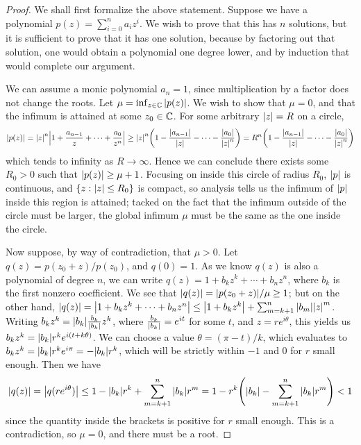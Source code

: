 \begin{proof}
    We shall first formalize the above statement.
    Suppose we have a polynomial \(p(z) = \sum_{i=0}^n a_i z^i\).
    We wish to prove that this has \(n\) solutions,
    but it is sufficient to prove that it has one solution,
    because by factoring out that solution,
    one would obtain a polynomial one degree lower,
    and by induction that would complete our argument.

    We can assume a monic polynomial \(a_n = 1\),
    since multiplication by a factor does not change the roots.
    Let \(\mu = \inf_{z\in\mathbb{C}}\abs{p(z)}\).
    We wish to show that \(\mu = 0\),
    and that the infimum is attained at some \(z_0 \in \mathbb{C}\).
    For some arbitrary \(\abs{z} = R\) on a circle,
    \begin{equation*}
        \abs{p(z)}
        = \abs{z}^n\abs{1 + \frac{a_{n-1}}{z} + \cdots + \frac{a_0}{z^n}}
        \geq \abs{z}^n\qty(1 - \frac{\abs{a_{n-1}}}{\abs{z}}
        - \cdots - \frac{\abs{a_0}}{\abs{z}^n})
        = R^n \qty(1 - \frac{\abs{a_{n-1}}}{\abs{z}}
        - \cdots - \frac{\abs{a_0}}{\abs{z}^n})
    \end{equation*}
    which tends to infinity as \(R \to \infty\).
    Hence we can conclude there exists some \(R_0 > 0\)
    such that \(\abs{p(z)} \geq \mu + 1\).
    Focusing on inside this circle of radius \(R_0\),
    \(\abs{p}\) is continuous, and \(\{z : \abs{z} \leq R_0\}\) is compact,
    so analysis tells us the infimum of \(\abs{p}\)
    inside this region is attained;
    tacked on the fact that the infimum outside of the circle must be larger,
    the global infimum \(\mu\) must be the same as the one inside the circle.
    
    Now suppose, by way of contradiction, that \(\mu > 0\).
    Let \(q(z) = p(z_0 + z)/p(z_0)\), and \(q(0) = 1\).
    As we know \(q(z)\) is also a polynomial of degree \(n\),
    we can write \(q(z) = 1 + b_k z^k + \cdots + b_n z^n\),
    where \(b_k\) is the first nonzero coefficient.
    We see that \(\abs{q(z)} = \abs{p(z_0+z)}/\mu \geq 1\);
    but on the other hand,
    \(\abs{q(z)} = \abs{1 + b_k z^k + \cdots + b_n z^n}
    \leq \abs{1 + b_k z^k} + \sum_{m=k+1}^n \abs{b_m}\abs{z}^m\).
    Writing \(b_k z^k = \abs{b_k}\frac{b_k}{\abs{b_k}}z^k\),
    where \(\frac{b_k}{\abs{b_k}} = e^{it}\) for some \(t\),
    and \(z = re^{i\theta}\),
    this yields us \(b_k z^k = \abs{b_k}r^k e^{i(t+k\theta)}\).
    We can choose a value \(\theta = (\pi-t)/k\),
    which evaluates to \(b_k z^k = \abs{b_k}r^k e^{i\pi} = -\abs{b_k}r^k\),
    which will be strictly within \(-1\) and \(0\) for \(r\) small enough.
    Then we have
    \begin{equation*}
        \abs{q(z)} = \abs{q(re^{i\theta})}
        \leq 1 - \abs{b_k}r^k + \sum_{m=k+1}^n \abs{b_k}r^m
        = 1 - r^k\qty(\abs{b_k} - \sum_{m=k+1}^n \abs{b_k}r^m) < 1
    \end{equation*}
    since the quantity inside the brackets is positive for \(r\) small enough.
    This is a contradiction,
    so \(\mu = 0\), and there must be a root.
\end{proof}
